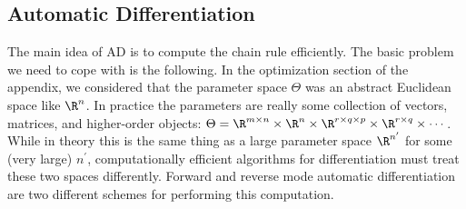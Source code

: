 \documentclass[../../book-main.tex]{subfiles}
\begin{document}
\subsection{Automatic Differentiation}

The main idea of AD is to compute the chain rule efficiently.
The basic problem we need to cope with is the following. In the
optimization section
of the appendix, we considered
that the parameter space \(\Theta\) was an abstract Euclidean space like
\(\R^{n}\). In practice the parameters are really some collection of vectors,
matrices, and higher-order objects: \(\Theta = \R^{m \times n} \times \R^{n}
\times \R^{r \times q \times p} \times \R^{r \times q} \times \cdots\). While in
theory this is the same thing as a large parameter space \(\R^{n^{\prime}}\) for
some (very large) \(n^{\prime}\), computationally efficient
algorithms for differentiation must treat these two spaces differently.
Forward and reverse mode automatic differentiation are two different schemes for
performing this computation.
\end{document}
